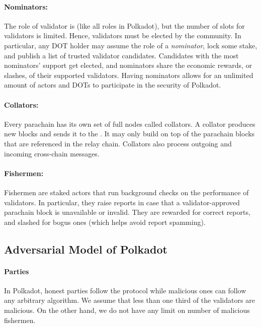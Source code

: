 \paragraph{Nominators:} The role of validator is 
 (like all roles in Polkadot),
but the number of slots for validators is limited. Hence, validators must be elected by the community.
In particular, any DOT holder may assume the role of a \emph{nominator}, lock some stake, and publish a list
of trusted validator candidates. Candidates with the most nominators' support get elected,
and nominators share the economic rewards, or slashes, of their supported validators.
Having nominators allows for an unlimited amount of actors and DOTs to participate in the security of Polkadot.

\paragraph{Collators: } Every parachain has its own set of full nodes called collators.
A collator produces new blocks and sends it to the .
It may only build on top of the parachain blocks that are referenced in the relay chain.
Collators also process outgoing and incoming cross-chain messages.

\paragraph{Fishermen:} Fishermen are staked actors that run background checks on the performance of validators.
In particular, they raise reports in case that a validator-approved parachain block is unavailable or invalid.
They are rewarded for correct reports, and slashed for bogus ones (which helps avoid report spamming).


\subsection{Adversarial Model of Polkadot}

\paragraph{Parties} In Polkadot, honest parties follow the protocol while malicious ones can follow any arbitrary algorithm. We assume that less than one third of the validators are malicious. On the other hand, we do not have any limit on number of malicious fishermen.

